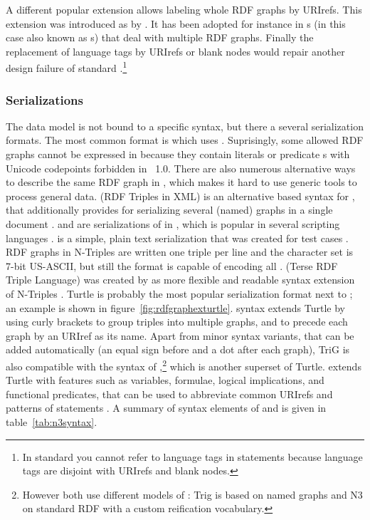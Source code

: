 A different popular extension
allows labeling whole RDF graphs by URIrefs. This extension was 
introduced as  by \textcite{Carroll2005}. It has been 
adopted for instance in s (in this case also known as 
s) that deal with multiple RDF graphs.
Finally the
replacement of language tags by URIrefs or blank nodes would repair 
another design failure of standard .\footnote{In standard 
you cannot refer to language tags in statements because language tags are 
disjoint with URIrefs and blank nodes.}

\subsubsection{Serializations}

The  data model is not bound to a specific syntax, but there a several
serialization formats. The most common format is  which uses 
 \cite{Beckett2004}. Suprisingly, some allowed RDF graphs cannot be 
expressed in  because they contain literals or predicate s
with Unicode codepoints forbidden in ~1.0. There are also numerous alternative
ways to describe the same RDF graph in , which makes it hard 
to use generic  tools to process general  data.
 (RDF Triples in XML) is an alternative  based syntax for
, that additionally provides for serializing several (named) graphs in
a single document \cite{Carroll2004}.  and  are serializations of
 in , which is popular
in several scripting languages \cite{Alexander2008,Sporny2012}.
 is a simple, plain text
serialization that was created for test cases \cite{Grant2004}. RDF graphs in
N-Triples are written one triple per line and the character set is 7-bit 
US-ASCII, but still the format is capable of encoding all . 
 (Terse RDF Triple Language) was created by 
as more flexible and readable syntax extension of N-Triples \cite{Beckett2007}.
Turtle is probably the most popular  serialization format next to 
; an example is shown in figure~\ref{fig:rdfgraphexturtle}.
 syntax \cite{Bizer2007,Carroll2005} extends Turtle by using curly 
brackets to group triples into multiple graphs, and to precede each graph by an
URIref as its name. Apart from minor syntax variants, that can be added 
automatically (an equal sign before and a dot after each graph), TriG is also 
compatible with the syntax of ,\footnote{However both use
different models of : Trig is based on named graphs and N3 on standard
RDF with a custom  reification vocabulary.} which is another superset of 
Turtle.  extends Turtle with features such as variables, formulae, logical 
implications, and functional predicates, that can be used to abbreviate common 
URIrefs and patterns of  statements \cite{BernersLee2008}. A summary 
of syntax elements of  and  is given in 
table~\ref{tab:n3syntax}.

